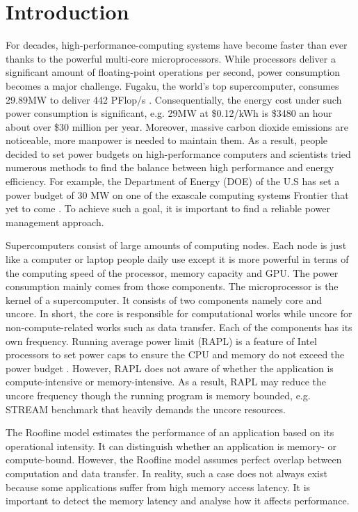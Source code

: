 \chapter{Introduction}

For decades,  high-performance-computing systems have become faster than ever thanks to the powerful multi-core microprocessors. While processors deliver a significant amount of floating-point operations per second, power consumption becomes a major challenge. Fugaku, the world's top supercomputer, consumes 29.89MW to deliver 442 PFlop/s \cite{1}. Consequentially, the energy cost under such power consumption is significant, e.g. 29MW at \$0.12/kWh \cite{26} is \$3480 an hour about over \$30 million per year. Moreover, massive carbon dioxide emissions are noticeable, more manpower is needed to maintain them. As a result, people decided to set power budgets on high-performance computers and scientists tried numerous methods to find the balance between high performance and energy efficiency. For example, the Department of Energy (DOE) of the U.S has set a power budget of 30 MW on one of the exascale computing systems Frontier that yet to come \cite{2}. To achieve such a goal, it is important to find a reliable power management approach.

Supercomputers consist of large amounts of computing nodes. Each node is just like a computer or laptop people daily use except it is more powerful in terms of the computing speed of the processor, memory capacity and GPU. The power consumption mainly comes from those components. The microprocessor is the kernel of a supercomputer. It consists of two components namely core and uncore. In short, the core is responsible for computational works while uncore for non-compute-related works such as data transfer. Each of the components has its own frequency.  Running average power limit (RAPL) is a feature of Intel processors to set power caps to ensure the CPU and memory do not exceed the power budget \cite{3}.  However, RAPL does not aware of whether the application is compute-intensive or memory-intensive. As a result, RAPL may reduce the uncore frequency though the running program is memory bounded, e.g. STREAM benchmark that heavily demands the uncore resources. 

The Roofline model estimates the performance of an application based on its operational intensity. It can distinguish whether an application is memory- or compute-bound. However, the Roofline model assumes perfect overlap between computation and data transfer. In reality, such a case does not always exist because some applications suffer from high memory access latency. It is important to detect the memory latency and analyse how it affects performance.

